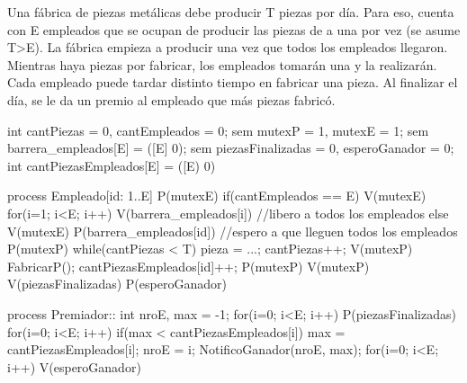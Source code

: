 Una fábrica de piezas metálicas debe producir T piezas por día. Para eso, cuenta con E
empleados que se ocupan de producir las piezas de a una por vez (se asume T>E). La
fábrica empieza a producir una vez que todos los empleados llegaron. Mientras haya
piezas por fabricar, los empleados tomarán una y la realizarán. Cada empleado puede
tardar distinto tiempo en fabricar una pieza. Al finalizar el día, se le da un premio al
empleado que más piezas fabricó.

int cantPiezas = 0, cantEmpleados = 0;
sem mutexP = 1, mutexE = 1;
sem barrera_empleados[E] = ([E] 0);
sem piezasFinalizadas = 0, esperoGanador = 0;
int cantPiezasEmpleados[E] = ([E) 0)

process Empleado[id: 1..E]
{
    P(mutexE)
    if(cantEmpleados == E)
    {
        V(mutexE)    
        for(i=1; i<E; i++) V(barrera_empleados[i]) //libero a todos los empleados
    } else {
        V(mutexE)
        P(barrera_empleados[id]) //espero a que lleguen todos los empleados
    }
    P(mutexP)
    while(cantPiezas < T)
    {
        pieza = ...;
        cantPiezas++;
        V(mutexP)
        FabricarP();
        cantPiezasEmpleados[id]++;
        P(mutexP)
    }
    V(mutexP)
    V(piezasFinalizadas)
    P(esperoGanador)
}

process Premiador::
{
    int nroE, max = -1;
    for(i=0; i<E; i++) P(piezasFinalizadas)
    for(i=0; i<E; i++)
    {
        if(max < cantPiezasEmpleados[i])
        {
            max = cantPiezasEmpleados[i];
            nroE = i;
        }
    }
    NotificoGanador(nroE, max);
    for(i=0; i<E; i++) V(esperoGanador)
}